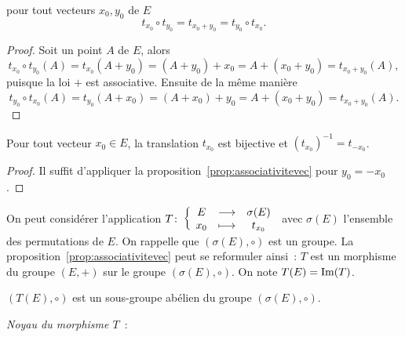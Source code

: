 \begin{prop}\label{prop:associativitevec}
  pour tout vecteurs \(x_0, y_0\) de \(E\)
  \begin{equation}
    t_{x_0} \circ t_{y_0} = t_{x_0 +y_0} = t_{y_0} \circ t_{x_0}.
  \end{equation}
\end{prop}
\begin{proof}
  Soit un point \(A\) de \(E\), alors
  \begin{equation}
    t_{x_0} \circ t_{y_0} (A)=t_{x_0}(A+y_0) = (A+y_0)+x_0 = A+(x_0+y_0)
    =t_{x_0+y_0}(A),
  \end{equation}
  puisque la loi \(+\) est associative. Ensuite de la même manière
  \begin{equation}
    t_{y_0} \circ t_{x_0} (A)=t_{y_0}(A+x_0) = (A+x_0)+y_0 =
    A+(x_0+y_0) = t_{x_0+y_0}(A).
  \end{equation}
\end{proof}

\begin{prop}
  Pour tout vecteur \(x_0 \in E\), la translation \(t_{x_0}\) est bijective et
  \((t_{x_0})^{-1} = t_{{-x}_0}\).
\end{prop}
\begin{proof}
  Il suffit d'appliquer la proposition~\ref{prop:associativitevec} pour \(y_0=-x_0\).
\end{proof}

On peut considérer l'application \(T\colon\left\{\begin{array}{ccc}E & \longrightarrow &\sigma(E)\\x_0 & \longmapsto & t_{x_0}\end{array}\right.\)
avec \(\sigma(E)\) l'ensemble des permutations de \(E\). On rappelle que
\((\sigma(E),\circ)\) est un groupe. La proposition~\ref{prop:associativitevec}
peut se reformuler ainsi~: \(T\) est un morphisme du
groupe \((E,+)\) sur le groupe \((\sigma(E),\circ)\). On note
\(T(E)=\operatorname{Im}(T)\).

\begin{prop}
  \((T(E),\circ)\) est un sous-groupe abélien du groupe \((\sigma(E),\circ)\).
\end{prop}

\emph{Noyau du morphisme \(T\)}~:

